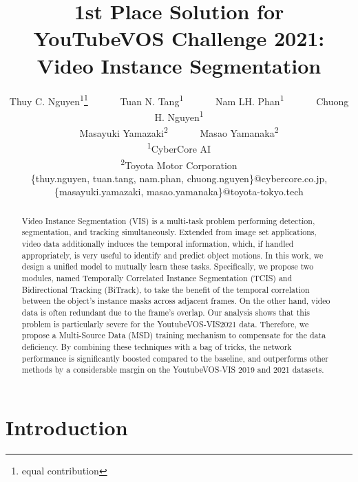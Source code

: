 \documentclass[10pt,twocolumn,letterpaper]{article}
\newcommand*\samethanks[1][\value{footnote}]{\footnotemark[#1]}
\begin{document}
\title{1st Place Solution for YouTubeVOS Challenge 2021: \\
	 Video Instance Segmentation}
\author{
	Thuy C. Nguyen\textsuperscript{1}\thanks{equal contribution}~~~~~~
	Tuan N. Tang\textsuperscript{1}\samethanks~~~~~~
	Nam LH. Phan\textsuperscript{1}~~~~~~
	Chuong H. Nguyen\textsuperscript{1}\\
	Masayuki Yamazaki\textsuperscript{2}~~~~~~
	Masao Yamanaka\textsuperscript{2}\\
	\textsuperscript{1}CyberCore AI\\
	\textsuperscript{2}Toyota Motor Corporation\\
	{\small \{thuy.nguyen, tuan.tang, nam.phan, chuong.nguyen\}@cybercore.co.jp, \{masayuki.yamazaki, masao.yamanaka\}@toyota-tokyo.tech}
}
\maketitle


\begin{abstract}


Video Instance Segmentation (VIS) is a multi-task problem performing detection, segmentation, and tracking simultaneously. Extended from image set applications, video data additionally induces the temporal information, which, if handled appropriately, is very useful to identify and predict object motions. In this work, we design a unified model to mutually learn these tasks. Specifically, we propose two modules, named Temporally Correlated Instance Segmentation (TCIS) and Bidirectional Tracking (BiTrack), to take the benefit of the temporal correlation between the object's instance masks across adjacent frames. 
On the other hand, video data is often redundant due to the frame's overlap. Our analysis shows that this problem is particularly severe for the YoutubeVOS-VIS2021 data. Therefore, we propose a Multi-Source Data (MSD) training mechanism to compensate for the data deficiency. By combining these techniques with a bag of tricks, the network performance is significantly boosted compared to the baseline, and outperforms other methods by a considerable margin on the YoutubeVOS-VIS 2019 and 2021 datasets. \end{abstract}


\section{Introduction}
\label{sec:introduction}
\end{document}
